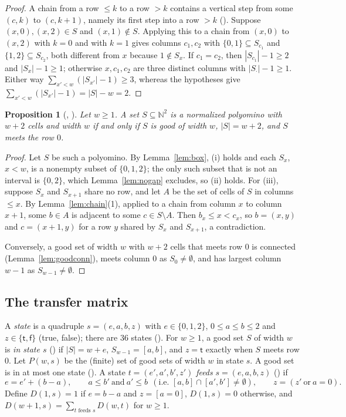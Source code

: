 \documentclass[11pt]{amsart}
\theoremstyle{plain}
\newtheorem{proposition}[theorem]{Proposition}
\theoremstyle{definition}
\newcommand{\N}{\mathbb{N}}
\newcommand{\tru}{\mathsf{t}}
\newcommand{\fls}{\mathsf{f}}
\begin{document}
\begin{proof}
A chain from a row $\le k$ to a row $>k$ contains a vertical step from some $(c,k)$ to $(c,k+1)$, namely its first step into a row $>k$ (). Suppose $(x,0),(x,2)\in S$ and $(x,1)\notin S$. Applying this to a chain from $(x,0)$ to $(x,2)$ with $k=0$ and with $k=1$ gives columns $c_1,c_2$ with $\{0,1\}\subseteq S_{c_1}$ and $\{1,2\}\subseteq S_{c_2}$, both different from $x$ because $1\notin S_x$. If $c_1=c_2$, then $|S_{c_1}|-1\ge2$ and $|S_x|-1\ge1$; otherwise $x,c_1,c_2$ are three distinct columns with $|S_\cdot|-1\ge1$. Either way $\sum_{x'<w}(|S_{x'}|-1)\ge3$, whereas the hypotheses give $\sum_{x'<w}(|S_{x'}|-1)=|S|-w=2$.
\end{proof}

\begin{proposition}[, ]\label{prop:struct}
Let $w\ge1$. A set $S\subseteq\N^2$ is a normalized polyomino with $w+2$ cells and width $w$ if and only if $S$ is good of width $w$, $|S|=w+2$, and $S$ meets the row $0$.
\end{proposition}

\begin{proof}
Let $S$ be such a polyomino. By Lemma~\ref{lem:box}, (i) holds and each $S_x$, $x<w$, is a nonempty subset of $\{0,1,2\}$; the only such subset that is not an interval is $\{0,2\}$, which Lemma~\ref{lem:nogap} excludes, so (ii) holds. For (iii), suppose $S_x$ and $S_{x+1}$ share no row, and let $A$ be the set of cells of $S$ in columns $\le x$. By Lemma~\ref{lem:chain}(1), applied to a chain from column $x$ to column $x+1$, some $b\in A$ is adjacent to some $c\in S\setminus A$. Then $b_x\le x<c_x$, so $b=(x,y)$ and $c=(x+1,y)$ for a row $y$ shared by $S_x$ and $S_{x+1}$, a contradiction.

Conversely, a good set of width $w$ with $w+2$ cells that meets row $0$ is connected (Lemma~\ref{lem:goodconn}), meets column $0$ as $S_0\ne\emptyset$, and has largest column $w-1$ as $S_{w-1}\ne\emptyset$.
\end{proof}

\subsection*{The transfer matrix}
A \emph{state} is a quadruple $s=(e,a,b,z)$ with $e\in\{0,1,2\}$, $0\le a\le b\le2$ and $z\in\{\tru,\fls\}$ (true, false); there are $36$ states (). For $w\ge1$, a good set $S$ of width $w$ is \emph{in state $s$} () if $|S|=w+e$, $S_{w-1}=[a,b]$, and $z=\tru$ exactly when $S$ meets row $0$. Let $P(w,s)$ be the (finite) set of good sets of width $w$ in state $s$. A good set is in at most one state (). A state $t=(e',a',b',z')$ \emph{feeds} $s=(e,a,b,z)$ () if
\[
  e=e'+(b-a),\qquad a\le b'\ \text{and}\ a'\le b\ \ (\text{i.e. }[a,b]\cap[a',b']\neq\emptyset),\qquad z=(z'\ \text{or}\ a=0).
\]
Define $D(1,s)=1$ if $e=b-a$ and $z=[a=0]$, $D(1,s)=0$ otherwise, and $D(w+1,s)=\sum_{t\text{ feeds }s}D(w,t)$ for $w\ge1$.
\end{document}
